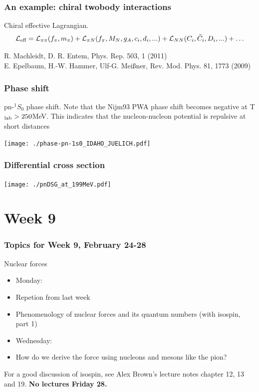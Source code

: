 \documentclass[compress]{beamer}
\begin{document}
\frame
{
\frametitle{An example: chiral twobody interactions}
\begin{block}{Chiral effective Lagrangian.}
\[
\mathcal{L_{\textnormal{eff}}} = \mathcal{L}_{\pi \pi}(f_\pi,m_{\pi}) + \mathcal{L}_{\pi N}(f_{\pi},M_{N},g_A,c_i,d_i,...) + \mathcal{L}_{NN}(C_{i},\tilde{C}_{i},D_{i},...) + \ldots
\]
\begin{tiny}
R. Machleidt, D. R. Entem, Phys. Rep. 503, 1 (2011)\\E. Epelbaum, H.-W. Hammer, Ulf-G. Mei\ss{}ner, Rev. Mod. Phys. 81, 1773 (2009)
\end{tiny}
\end{block}
}

\frame
{
\frametitle{Phase shift}
pn-$^1S_0$ phase shift. Note that the Nijm93 PWA phase shift becomes negative at T$_{\textnormal{lab}}> 250$MeV. This indicates that the nucleon-nucleon potential is repulsive at short distances 
\begin{center}
\texttt{[image: ./phase-pn-1s0\_IDAHO\_JUELICH.pdf]}
\end{center}
}

\frame
{
\frametitle{Differential cross section}
\begin{center}
\texttt{[image: ./pnDSG\_at\_199MeV.pdf]}
\end{center}
}

\section[Week 9]{Week 9}

\frame
{
  \frametitle{Topics for Week 9, February 24-28}
  \begin{block}{Nuclear forces}
\begin{itemize}
\item Monday:
\item Repetion from last week
\item Phenomenology of nuclear forces and its quantum numbers (with isospin, part 1)
\item Wednesday:
\item How do we derive the force using nucleons and mesons like the pion? 
\end{itemize}
For a good discussion of isospin, see Alex Brown's lecture notes chapter 12, 13 and 19.  {\bf No lectures Friday 28.}


  \end{block}
} 
\end{document}
